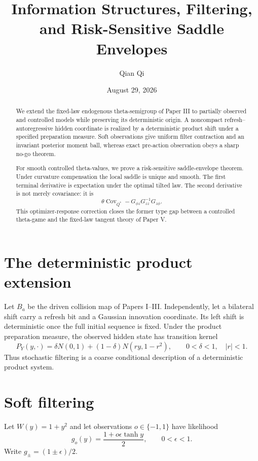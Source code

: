 \documentclass[11pt,reqno]{amsart}
\title[Information and saddle-envelope extensions]{Information Structures, Filtering, and Risk-Sensitive Saddle Envelopes}
\author{Qian Qi}
\date{August 29, 2026}
\theoremstyle{remark}
\newcommand{\abs}[1]{\left\lvert #1\right\rvert}
\begin{document}
\raggedbottom
\begin{abstract}
We extend the fixed-law endogenous theta-semigroup of Paper III to partially
observed and controlled models while preserving its deterministic origin.  A
noncompact refresh--autoregressive hidden coordinate is realized by a
deterministic product shift under a specified preparation measure.  Soft
observations give uniform filter contraction and an invariant posterior moment
ball, whereas exact pre-action observation obeys a sharp no-go theorem.

For smooth controlled theta-values, we prove a risk-sensitive saddle-envelope
theorem.  Under curvature compensation the local saddle is unique and smooth.
The first terminal derivative is expectation under the optimal tilted law.
The second derivative is not merely covariance: it is
\[
 \theta\operatorname{Cov}_{Q^*}-
 G_{\phi z}G_{zz}^{-1}G_{z\phi}.
\]
This optimizer-response correction closes the former type gap between a
controlled theta-game and the fixed-law tangent theory of Paper V.
\end{abstract}
\maketitle
\tableofcontents
\enlargethispage{4pt}

\section{The deterministic product extension}
Let $B_a$ be the driven collision map of Papers I--III.  Independently, let a
bilateral shift carry a refresh bit and a Gaussian innovation coordinate.  Its
left shift is deterministic once the full initial sequence is fixed.  Under
the product preparation measure, the observed hidden state has transition
kernel
\[
 P_Y(y,\cdot)=\delta N(0,1)+(1-\delta)N(ry,1-r^2),
 \qquad 0<\delta<1,\quad\abs r<1.
\]
Thus stochastic filtering is a coarse conditional description of a
deterministic product system.

\section{Soft filtering}
Let $W(y)=1+y^2$ and let observations $o\in\{-1,1\}$ have likelihood
\[
 g_o(y)=\frac{1+o\epsilon\tanh y}{2},\qquad0<\epsilon<1.
\]
Write $g_\pm=(1\pm\epsilon)/2$.
\end{document}
